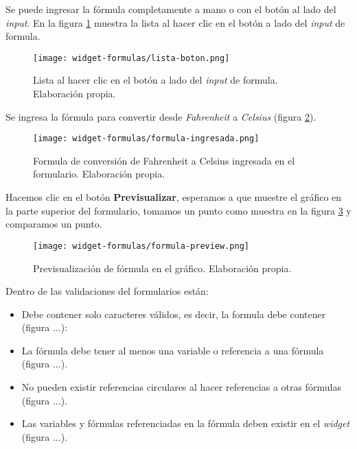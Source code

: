 Se puede ingresar la fórmula completamente a mano o con el botón al lado del \textit{input}. En la figura \ref{fig:lista-boton} muestra la lista al hacer clic en el botón a lado del \textit{input} de formula.
\iffalse lista de boton \fi
\begin{figure}[H]
	\centering
	\texttt{[image: widget-formulas/lista-boton.png]}
	\caption{\label{fig:lista-boton} Lista al hacer clic en el botón a lado del \textit{input} de formula. Elaboración propia.}
\end{figure}

Se ingresa la fórmula para convertir desde \textit{Fahrenheit} a \textit{Celsius} (figura \ref{fig:formula-ingresada}).
\iffalse formula \fi
\begin{figure}[H]
	\centering
	\texttt{[image: widget-formulas/formula-ingresada.png]}
	\caption{\label{fig:formula-ingresada} Formula de conversión de Fahrenheit a Celsius ingresada en el formulario. Elaboración propia.}
\end{figure}

Hacemos clic en el botón \textbf{Previsualizar}, esperamos a que muestre el gráfico en la parte superior del formulario, tomamos un punto como muestra en la figura \ref{fig:formula-preview} y comparamos un punto.
\iffalse formula previsualizada \fi
\iffalse formula con punto seleccionado \fi
\begin{figure}[H]
	\centering
	\texttt{[image: widget-formulas/formula-preview.png]}
	\caption{\label{fig:formula-preview} Previsualización de fórmula en el gráfico. Elaboración propia.}
\end{figure}


\iffalse agregar referencia a formulas \fi

Dentro de las validaciones del formularios están:
\begin{itemize}
    \item Debe contener solo caracteres válidos, es decir, la formula debe contener (figura ...): 
    \item La fórmula debe tener al menos una variable o referencia a una fórmula (figura ...).
    \item No pueden existir referencias circulares al hacer referencias a otras fórmulas (figura ...).
    \item Las variables y fórmulas referenciadas en la fórmula deben existir en el \textit{widget} (figura ...).        
\end{itemize}
\iffalse
